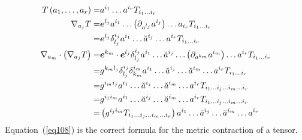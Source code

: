 \begin{align}
	{T}\left ( {a_{1},\dots,a_{r}} \right ) =& a^{i_{1}}\dots a^{i_{r}}T_{i_{1}\dots i_{r}} \\
	\nabla_{a_{j}}T =& \bm{e}^{l_{j}} a^{i_{1}}\dots\left (\partial_{a^{l_j}}a^{i_{j}}\right )\dots a_{i_{r}}T_{i_{1}\dots i_{r}} \nonumber \\
	=& \bm{e}^{l_{j}}\delta_{l_{j}}^{i_{j}} a^{i_{1}}\dots \breve{a}^{i_{j}}\dots a^{i_{r}}T_{i_{1}\dots i_{r}} \\
	\nabla_{a_{m}}\cdot\left (\nabla_{a_{j}}T\right ) =& \bm{e}^{k_{m}}\cdot\bm{e}^{l_{j}}\delta_{l_{j}}^{i_{j}} 
	                                          a^{i_{1}}\dots \breve{a}^{i_{j}}\dots\left (\partial_{a^{k_m}}a^{i_{m}}\right ) 
	                                          \dots a^{i_{r}}T_{i_{1}\dots i_{r}} \nonumber \\
	                                         =& g^{k_{m}l_{j}}\delta_{l_{j}}^{i_{j}}\delta_{k_{m}}^{i_{m}} 
	                                          a^{i_{1}}\dots \breve{a}^{i_{j}}\dots\breve{a}^{i_{m}} 
	                                          \dots a^{i_{r}}T_{i_{1}\dots i_{r}} \nonumber \\
	                                         =& g^{i_{m}i_{j}}a^{i_{1}}\dots \breve{a}^{i_{j}}\dots\breve{a}^{i_{m}} 
	                                          \dots a^{i_{r}}T_{i_{1}\dots i_{j}\dots i_{m}\dots i_{r}} \nonumber \\
	                                         =& g^{i_{j}i_{m}}a^{i_{1}}\dots \breve{a}^{i_{j}}\dots\breve{a}^{i_{m}} 
	                                          \dots a^{i_{r}}T_{i_{1}\dots i_{j}\dots i_{m}\dots i_{r}}  \nonumber \\
	                                         =& \left ( g^{i_{j}i_{m}}T_{i_{1}\dots i_{j}\dots i_{m}\dots i_{r}}\right ) a^{i_{1}}\dots
	                                          \breve{a}^{i_{j}}\dots\breve{a}^{i_{m}}\dots a^{i_{r}} \label{eq108}
\end{align} 
Equation~(\ref{eq108}) is the correct formula for the metric contraction of a tensor.

